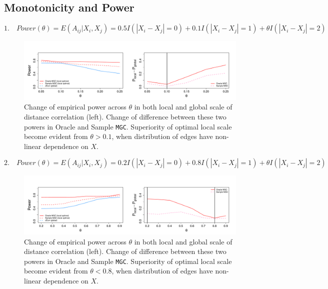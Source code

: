 \documentclass[12pt]{article}
\theoremstyle{definition}
\begin{document}
\subsection{Monotonicity and Power}


\begin{equation}
1. \quad Power(\theta) = E(A_{ij} | X_{i}, X_{j}) = 0.5 I(|X_{i} - X_{j}| = 0) + 0.1 I(|X_{i} - X_{j}| = 1) + \theta I(|X_{i} - X_{j}| = 2)
\end{equation}

\begin{figure}[H]
	\centering
	\includegraphics[width=6in]{../Figure/powerplot_mmono.pdf}
	\caption{Change of empirical power across $\theta$ in both local and global scale of distance correlation (left). Change of difference between these two powers in Oracle and Sample \texttt{MGC}. Superiority of optimal local scale become evident from $\theta > 0.1$, when distribution of edges have non-linear dependence on $X$.}
	\label{fig:powerplot_mmono}
\end{figure}

\begin{equation}
2. \quad Power(\theta) = E(A_{ij} | X_{i}, X_{j}) = 0.2 I(|X_{i} - X_{j}| = 0) + 0.8 I(|X_{i} - X_{j}| = 1) + \theta I(|X_{i} - X_{j}| = 2)
\end{equation}

\begin{figure}[H]
	\centering
	\includegraphics[width=6in]{../Figure/powerplot_mmmono.pdf}
	\caption{Change of empirical power across $\theta$ in both local and global scale of distance correlation (left). Change of difference between these two powers in Oracle and Sample \texttt{MGC}. Superiority of optimal local scale become evident from $\theta < 0.8$, when distribution of edges have non-linear dependence on $X$.}
	\label{fig:powerplot_mmmono}
\end{figure}
\end{document}
